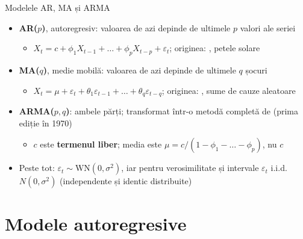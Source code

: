 \begin{frame}{Modelele AR, MA și ARMA}
\itemsize{\small}
\begin{itemize}
    \item \textbf{AR($p$)}, autoregresiv: valoarea de azi depinde de ultimele $p$ valori ale seriei
    \begin{itemize}
        \item $X_t = c + \phi_1X_{t-1} + \dots + \phi_pX_{t-p} + \varepsilon_t$; originea: , petele solare
    \end{itemize}
    \item \textbf{MA($q$)}, medie mobilă: valoarea de azi depinde de ultimele $q$ șocuri
    \begin{itemize}
        \item $X_t = \mu + \varepsilon_t + \theta_1\varepsilon_{t-1} + \dots + \theta_q\varepsilon_{t-q}$; originea: , sume de cauze aleatoare
    \end{itemize}
    \item \textbf{ARMA($p,q$)}: ambele părți; transformat într-o metodă completă de  (prima ediție în 1970)
    \begin{itemize}
        \item $c$ este \textbf{termenul liber}; media este $\mu = c/(1 - \phi_1 - \dots - \phi_p)$, nu $c$
    \end{itemize}
    \item Peste tot: $\varepsilon_t \sim \mathrm{WN}(0, \sigma^2)$, iar pentru verosimilitate și intervale $\varepsilon_t$ i.i.d. $N(0, \sigma^2)$ (independente și identic distribuite)
\end{itemize}
\end{frame}


\section{Modele autoregresive}

